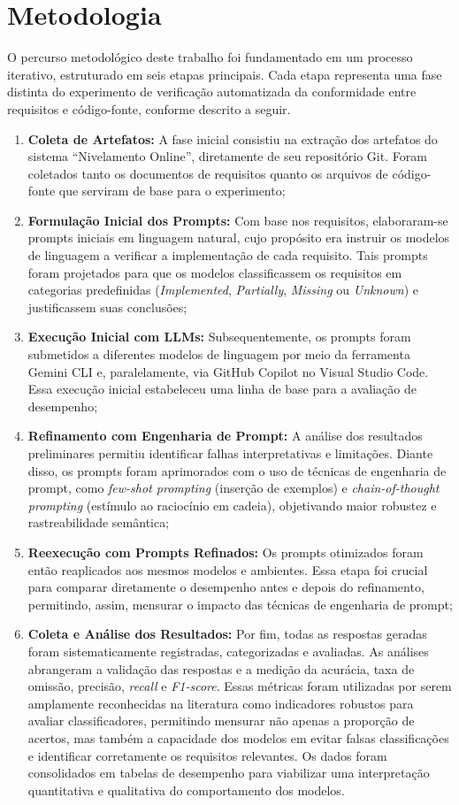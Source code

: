 \section{Metodologia}

O percurso metodológico deste trabalho foi fundamentado em um processo iterativo, estruturado em seis etapas principais. Cada etapa representa uma fase distinta do experimento de verificação automatizada da conformidade entre requisitos e código-fonte, conforme descrito a seguir. 

\begin{enumerate}
    \item \textbf{Coleta de Artefatos:} A fase inicial consistiu na extração dos artefatos do sistema “Nivelamento Online”, diretamente de seu repositório Git. Foram coletados tanto os documentos de requisitos quanto os arquivos de código-fonte que serviram de base para o experimento;
    \item \textbf{Formulação Inicial dos Prompts:} Com base nos requisitos, elaboraram-se prompts iniciais em linguagem natural, cujo propósito era instruir os modelos de linguagem a verificar a implementação de cada requisito. Tais prompts foram projetados para que os modelos classificassem os requisitos em categorias predefinidas (\textit{Implemented}, \textit{Partially}, \textit{Missing} ou \textit{Unknown}) e justificassem suas conclusões;
    \item \textbf{Execução Inicial com LLMs:} Subsequentemente, os prompts foram submetidos a diferentes modelos de linguagem por meio da ferramenta Gemini CLI e, paralelamente, via GitHub Copilot no Visual Studio Code. Essa execução inicial estabeleceu uma linha de base para a avaliação de desempenho;
    \item \textbf{Refinamento com Engenharia de Prompt:} A análise dos resultados preliminares permitiu identificar falhas interpretativas e limitações. Diante disso, os prompts foram aprimorados com o uso de técnicas de engenharia de prompt, como \textit{few-shot prompting} (inserção de exemplos) e \textit{chain-of-thought prompting} (estímulo ao raciocínio em cadeia), objetivando maior robustez e rastreabilidade semântica;
    \item \textbf{Reexecução com Prompts Refinados:} Os prompts otimizados foram então reaplicados aos mesmos modelos e ambientes. Essa etapa foi crucial para comparar diretamente o desempenho antes e depois do refinamento, permitindo, assim, mensurar o impacto das técnicas de engenharia de prompt;
    \item \textbf{Coleta e Análise dos Resultados:} Por fim, todas as respostas geradas foram sistematicamente registradas, categorizadas e avaliadas. As análises abrangeram a validação das respostas e a medição da acurácia, taxa de omissão, precisão, \textit{recall} e \textit{F1-score}. Essas métricas foram utilizadas por serem amplamente reconhecidas na literatura como indicadores robustos para avaliar classificadores, permitindo mensurar não apenas a proporção de acertos, mas também a capacidade dos modelos em evitar falsas classificações e identificar corretamente os requisitos relevantes. Os dados foram consolidados em tabelas de desempenho para viabilizar uma interpretação quantitativa e qualitativa do comportamento dos modelos.

\end{enumerate}
